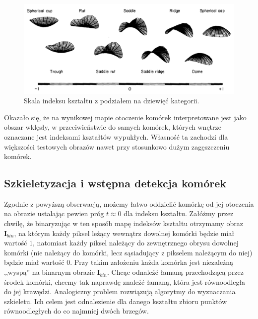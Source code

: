 \documentclass[declaration,shortabstract,mgr]{iithesis}
\newcommand{\image}{\mathbf{I}}
\begin{document}
\begin{figure}
  \includegraphics[width=\textwidth]{images/shape-index-range.png}
  \caption{Skala indeksu kształtu z podziałem na dziewięć kategorii. \cite{paper:shape-index}}
  \label{fig:shape-index-range}
\end{figure}

Okazało się, że na wynikowej mapie otoczenie komórek interpretowane jest jako obszar wklęsły, w przeciwieństwie do samych komórek, których wnętrze oznaczane jest indeksami kształtów wypukłych.
Własność ta zachodzi dla większości testowych obrazów nawet przy stosunkowo dużym zagęszczeniu komórek.

\subsection{Szkieletyzacja i wstępna detekcja komórek}

Zgodnie z powyższą obserwacją, możemy łatwo oddzielić komórkę od jej otoczenia na obrazie ustalając pewien próg $t \approx 0$ dla indeksu kształtu.
Załóżmy przez chwilę, że binaryzując w ten sposób mapę indeksów kształtu otrzymamy obraz $\image_{bin}$, na którym każdy piksel leżący wewnątrz dowolnej komórki będzie miał wartość $1$, natomiast każdy piksel należący do zewnętrznego obrysu dowolnej komórki (nie należący do komórki, lecz sąsiadujący z pikselem należącym do niej) będzie miał wartość $0$.
Przy takim założeniu każda komórka jest niezależną ,,wyspą'' na binarnym obrazie $\image_{bin}$.
Chcąc odnaleźć łamaną przechodzącą przez środek komórki, chcemy tak naprawdę znaleźć łamaną, która jest równoodległa do jej krawędzi.
Analogiczny problem rozwiązują algorytmy do wyznaczania szkieletu.
Ich celem jest odnalezienie dla danego kształtu zbioru punktów równoodległych do co najmniej dwóch brzegów.
\end{document}
